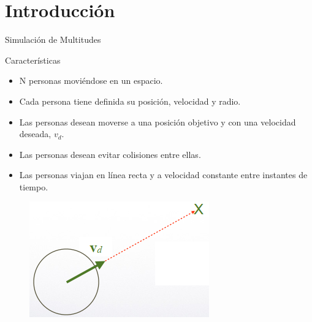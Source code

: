 \section{Introducción}\label{sec:introduccion}

\begin{frame}{Simulación de Multitudes}
    \begin{center}
        \begin{minipage}[c]{0.6\textwidth}
            \begin{block}{Características}
                \begin{itemize}
                    \item N personas moviéndose en un espacio.
                    \item Cada persona tiene definida su posición, velocidad y radio.
                    \item Las personas desean moverse a una posición objetivo y con una velocidad deseada, $v_d$.
                    \item Las personas desean evitar colisiones entre ellas.
                    \item Las personas viajan en línea recta y a velocidad constante entre instantes de tiempo.
                \end{itemize}
            \end{block}
        \end{minipage}
        \hfill
        \begin{minipage}[c]{0.3\textwidth}
            \begin{figure}
                \centering
                \includegraphics[width=\textwidth]{pic/01-introduccion/particle-vd}
                \label{fig:particle-vd}
            \end{figure}
        \end{minipage}
    \end{center}
\end{frame}


